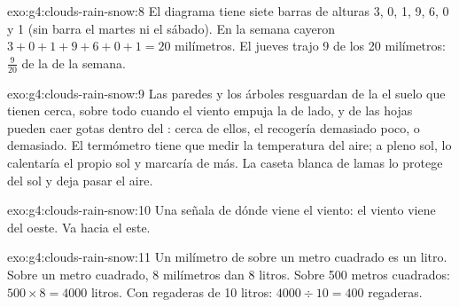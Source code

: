 \begin{solution}{exo:g4:clouds-rain-snow:8}
El diagrama tiene siete barras de alturas 3, 0, 1, 9, 6, 0 y 1 (sin barra
el martes ni el sábado). En la semana cayeron
$3 + 0 + 1 + 9 + 6 + 0 + 1 = 20$ milímetros. El jueves trajo 9 de los
20 milímetros: $\frac{9}{20}$ de la  de la semana.
\end{solution}

\begin{solution}{exo:g4:clouds-rain-snow:9}
Las paredes y los árboles resguardan de la  el suelo que tienen
cerca, sobre todo cuando el viento empuja la  de lado, y de las hojas
pueden caer gotas dentro del : cerca de ellos, el 
recogería demasiado poco, o demasiado. El termómetro tiene que medir la
temperatura del aire; a pleno sol, lo calentaría el propio sol y marcaría
de más. La caseta blanca de lamas lo protege del sol y deja pasar el aire.
\end{solution}

\begin{solution}{exo:g4:clouds-rain-snow:10}
Una  señala de dónde viene el viento: el viento viene del oeste. Va
hacia el este.
\end{solution}

\begin{solution}{exo:g4:clouds-rain-snow:11}
Un milímetro de  sobre un metro cuadrado es un litro. Sobre un metro
cuadrado, 8 milímetros dan 8 litros. Sobre 500 metros cuadrados:
$500 \times 8 = 4000$ litros. Con regaderas de 10 litros:
$4000 \div 10 = 400$ regaderas.
\end{solution}
